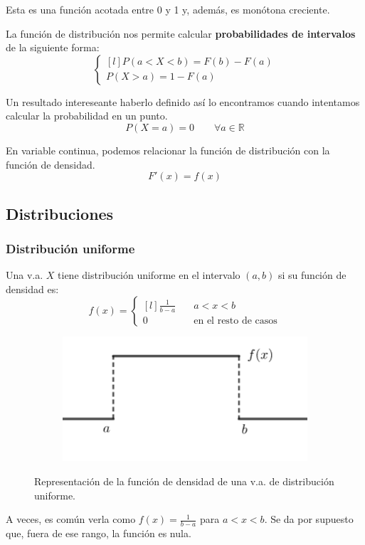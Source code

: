 \documentclass[a4paper]{book}
\begin{document}
Esta es una función acotada entre 0 y 1 y, además, es monótona creciente.

La función de distribución nos permite calcular \textbf{probabilidades de intervalos} de la siguiente forma: \[\left\{ \begin{matrix*}[l]
		P(a<X<b) = F(b) - F(a)\\[5pt]
		P(X>a) = 1 - F(a) \end{matrix*}\right.\]

Un resultado intereseante haberlo definido así lo encontramos cuando intentamos calcular la probabilidad en un punto. \[P(X=a) = 0 \qquad \forall a \in \mathbb{R}\]

\begin{nota}
	En variable continua, podemos relacionar la función de distribución con la función de densidad.
	\[F'(x) = f(x)\]
\end{nota}


\subsection{Distribuciones}
\subsubsection{Distribución uniforme}
Una v.a. $X$ tiene distribución uniforme en el intervalo $(a,b)$ si su función de densidad es: \[f(x) = \left\{ \begin{matrix*}[l]
		\displaystyle{\frac{1}{b-a}} & \quad a<x<b\\[15pt]
		0 & \quad \text{en el resto de casos}
	\end{matrix*}\right.\]

\begin{figure}[h!]
	\begin{subfigure}[b]{\linewidth}
		\centering
		\includegraphics[width=0.4\linewidth]{aaa.png}
	\end{subfigure}
	\caption{Representación de la función de densidad de una v.a. de distribución uniforme.}
\end{figure}

A veces, es común verla como $f(x) = \frac{1}{b-a}$ para $a<x<b$. Se da por supuesto que, fuera de ese rango, la función es nula.
\end{document}
